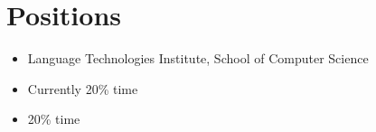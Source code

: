 




\section{Positions}
\begin{itemize}[leftmargin=-0.4mm,partopsep=0pt,label=]
  \item {}
    Language Technologies Institute, School of Computer Science

  \item {}
    Currently 20\% time

  \item {}
    20\% time

\end{itemize}

